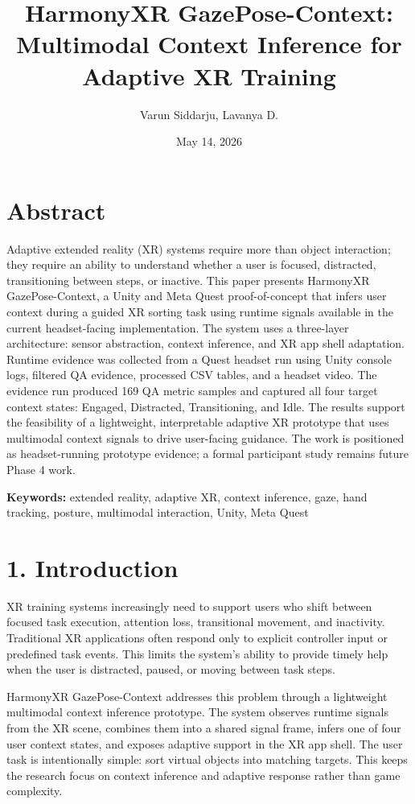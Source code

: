 \documentclass[
  10pt,
]{article}
\title{HarmonyXR GazePose-Context: Multimodal Context Inference for
Adaptive XR Training}
\author{Varun Siddarju, Lavanya D.}
\date{May 14, 2026}
\begin{document}
\maketitle

\section{Abstract}\label{abstract}

Adaptive extended reality (XR) systems require more than object
interaction; they require an ability to understand whether a user is
focused, distracted, transitioning between steps, or inactive. This
paper presents HarmonyXR GazePose-Context, a Unity and Meta Quest
proof-of-concept that infers user context during a guided XR sorting
task using runtime signals available in the current headset-facing
implementation. The system uses a three-layer architecture: sensor
abstraction, context inference, and XR app shell adaptation. Runtime
evidence was collected from a Quest headset run using Unity console
logs, filtered QA evidence, processed CSV tables, and a headset video.
The evidence run produced 169 QA metric samples and captured all four
target context states: Engaged, Distracted, Transitioning, and Idle. The
results support the feasibility of a lightweight, interpretable adaptive
XR prototype that uses multimodal context signals to drive user-facing
guidance. The work is positioned as headset-running prototype evidence;
a formal participant study remains future Phase 4 work.

\textbf{Keywords:} extended reality, adaptive XR, context inference,
gaze, hand tracking, posture, multimodal interaction, Unity, Meta Quest

\section{1. Introduction}\label{introduction}

XR training systems increasingly need to support users who shift between
focused task execution, attention loss, transitional movement, and
inactivity. Traditional XR applications often respond only to explicit
controller input or predefined task events. This limits the system's
ability to provide timely help when the user is distracted, paused, or
moving between task steps.

HarmonyXR GazePose-Context addresses this problem through a lightweight
multimodal context inference prototype. The system observes runtime
signals from the XR scene, combines them into a shared signal frame,
infers one of four user context states, and exposes adaptive support in
the XR app shell. The user task is intentionally simple: sort virtual
objects into matching targets. This keeps the research focus on context
inference and adaptive response rather than game complexity.
\end{document}
